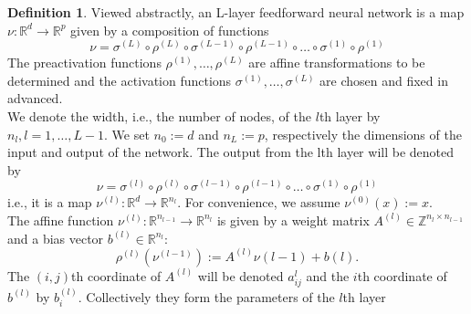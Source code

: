 \documentclass{article}
\theoremstyle{definition}
\newtheorem{definition}[theorem]{Definition}
\newtheorem{comment}[theorem]{Comment}
\begin{document}
\begin{definition}
Viewed abstractly, an L-layer feedforward neural network is a map $\nu : \mathbb{R}^{d} \to \mathbb{R}^{p}$ given by a composition of functions
$$ \nu = \sigma^{(L)} \circ \rho^{(L)} \circ \sigma^{(L-1)} \circ \rho^{(L-1)} \circ \dots \circ \sigma^{(1)} \circ \rho^{(1)}$$
The preactivation functions $\rho^{(1)}, \dots , \rho^{(L)}$ are affine transformations to be determined and the activation functions $\sigma^{(1)}, \dots , \sigma^{(L)}$ are chosen and fixed in advanced. \\
We denote the width, i.e., the number of nodes, of the $l$th
layer by $n_l, l = 1, \dots , L-1$. We set $n_0 := d$ and $n_L := p$, respectively the dimensions of the input and output of the network. The output from the lth layer will be denoted by
$$\nu = \sigma^{(l)} \circ \rho^{(l)} \circ \sigma^{(l-1)} \circ \rho^{(l-1)} \circ \dots \circ \sigma^{(1)} \circ \rho^{(1)}$$
i.e., it is a map $\nu^{(l)} : \mathbb{R}^{d} \to \mathbb{R}^{n_l}$. For convenience, we assume $\nu^{(0)}(x) := x$. \\
The affine function $\nu^{(l)} : \mathbb{R}^{n_{l-1}} \to \mathbb{R}^{n_{l}}$ is given by a weight matrix $A^{(l)} \in \mathbb{Z}^{n_l \times n_{l-1}} $ and a bias vector $b^{(l)} \in \mathbb{R}^{n_l}$:
$$ \rho^{(l)}(\nu^{(l-1)}) := A^{(l)} \nu{(l-1)} + b{(l)}. $$
The $(i, j)$th coordinate of $A^{(l)}$ will be denoted $a^{l}_{ij}$ and the $i$th coordinate of $b^{(l)}$ by $b^{(l)}_{i}$. Collectively they form the parameters of the $l$th layer
\end{definition}

\end{document}
